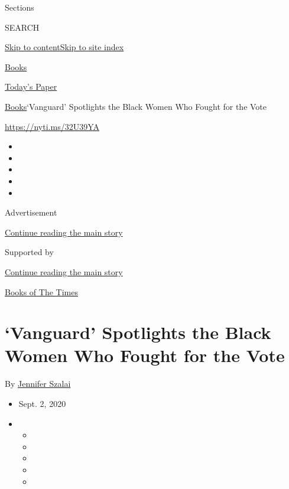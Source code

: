 Sections

SEARCH

\protect\hyperlink{site-content}{Skip to
content}\protect\hyperlink{site-index}{Skip to site index}

\href{https://www.nytimes3xbfgragh.onion/section/books}{Books}

\href{https://myaccount.nytimes3xbfgragh.onion/auth/login?response_type=cookie\&client_id=vi}{}

\href{https://www.nytimes3xbfgragh.onion/section/todayspaper}{Today's
Paper}

\href{/section/books}{Books}\textbar{}`Vanguard' Spotlights the Black
Women Who Fought for the Vote

\url{https://nyti.ms/32U39YA}

\begin{itemize}
\item
\item
\item
\item
\item
\end{itemize}

Advertisement

\protect\hyperlink{after-top}{Continue reading the main story}

Supported by

\protect\hyperlink{after-sponsor}{Continue reading the main story}

\href{/column/books-of-the-times}{Books of The Times}

\hypertarget{vanguard-spotlights-the-black-women-who-fought-for-the-vote}{%
\section{`Vanguard' Spotlights the Black Women Who Fought for the
Vote}\label{vanguard-spotlights-the-black-women-who-fought-for-the-vote}}

By \href{https://www.nytimes3xbfgragh.onion/by/jennifer-szalai}{Jennifer
Szalai}

\begin{itemize}
\item
  Sept. 2, 2020
\item
  \begin{itemize}
  \item
  \item
  \item
  \item
  \item
  \end{itemize}
\end{itemize}

